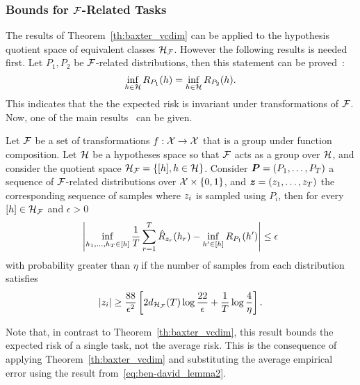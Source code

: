 \subsubsection*{Bounds for $\mathcal{F}$-Related Tasks}
The results of Theorem~\ref{th:baxter_vcdim} can be applied to the hypothesis quotient space of equivalent classes $\mathcal{H}_{\mathcal{F}}$. However the following results is needed first.
%
Let $P_1, P_2$ be $\mathcal{F}$-related distributions, then this statement can be proved~\cite[Lemma~2]{Ben-DavidB08}:
\begin{equation}
    \label{eq:ben-david_lemma2}
    \inf_{\hypf \in \hypspace} \risk_{P_1}(\hypf) = \inf_{\hypf \in \hypspace} \risk_{P_2}(\hypf).
\end{equation}
This indicates that the the expected risk is invariant under transformations of $\mathcal{F}$.
Now, one of the main results~\cite[Theorem~2]{baxter2000model} can be given.
\begin{theorem}\label{th:ben-david_th2}
    Let $\mathcal{F}$ be a set of transformations $f: \mathcal{X} \to \mathcal{X}$ that is a group under function composition. Let $\mathcal{H}$ be a hypotheses space so that $\mathcal{F}$ acts as a group over $\mathcal{H}$, and consider the quotient space $\mathcal{H}_{\mathcal{F}} = \left\{\lbrack h\rbrack, h \in \mathcal{H}\right\}$.
    Consider $\bm{P} = (P_1, \ldots, P_T)$ a sequence of $\mathcal{F}$-related distributions over $\mathcal{X} \times \left\{0, 1\right\}$, and $\bm{z} = (z_1, \ldots, z_T)$ the corresponding sequence of samples  where $z_i$ is sampled using $P_i$, then for every $\lbrack h\rbrack \in \mathcal{H}_{\mathcal{F}}$ and $\epsilon > 0$ 
    \begin{equation}
        \nonumber
        \left|\inf_{h_1, \ldots, h_T \in \lbrack h\rbrack} \frac{1}{T} \sum_{r=1}^T \hat{R}_{z_r}(h_r) - \inf_{h' \in \lbrack h\rbrack}R_{P_1}(h')\right|  \leq \epsilon
    \end{equation}
    with probability greater than $\eta$ if the number of samples from each distribution satisfies
    \begin{equation}
        \label{eq:ben-david_sample_inequality}
        \cardinal{\sample_i} \geq  \frac{88}{\epsilon^2} \left[2 d_{\hypspace_\frelset}(\ntasks) \log \frac{22}{\epsilon} + \frac{1}{\ntasks}\log\frac{4}{\eta} \right].
    \end{equation}
\end{theorem}
Note that, in contrast to Theorem~\ref{th:baxter_vcdim}, this result bounds the expected risk of a single task, not the average risk. This is the consequence of applying Theorem~\ref{th:baxter_vcdim} and substituting the average empirical error using the result from~\eqref{eq:ben-david_lemma2}.
